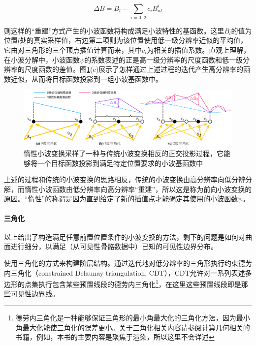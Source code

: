 \begin{equation}
	\Delta B=B_l-\sum_{i=0..2}c_iB^{i}_{nl}
\end{equation}

\noindent 则这样的“重建”方式产生的小波函数将构成满足小波特性的基函数。这里$B_l$的值为位置$l$处的真实采样值，右边第二项则为该位置使用低一级分辨率近似的平均值，它由对三角形的三个顶点插值计算而来，其中$c_i$为相关的插值系数。直观上理解，在小波分解中，小波函数$\psi$的系数表述的正是高一级分辨率的尺度函数和低一级分辨率的尺度函数的差值。图\ref{f:r-triangulation}(c)展示了怎样通过上述过程的迭代产生高分辨率的函数近似，从而将目标函数投影到一组小波基函数中。

\begin{figure}
\begin{fullwidth}
	\includegraphics[width=\thewidth]{figures/r/triangulation}
	\caption{惰性小波变换采样了一种与传统小波变换相反的正交投影过程，它能够将一个目标函数投影到满足特定位置要求的小波基函数中}
	\label{f:r-triangulation}
\end{fullwidth}
\end{figure}

上述的过程和传统的小波变换的思路相反，传统的小波变换由高分辨率向低分辨分解，而惰性小波函数由低分辨率向高分辨率“重建”，所以这是称为前向小波变换的原因。“惰性”的称谓是因为直到给定了新的插值点才能确定其使用的小波函数$\psi$。




\paragraph{三角化}
以上给出了构造满足任意前置位置条件的小波变换的方法，剩下的问题是如何对曲面进行细分，以满足（从可见性骨骼数据中）已知的可见性边界分布。

\cite{a:FastandAccurateHierarchicalRadiosityUsingGlobalVisibility}使用三角化的方式来构建阶层结构。通过迭代地对低分辨率的三角形执行约束德劳内三角化（constrained Delaunay triangulation, CDT）\cite{a:Hierarchicaltriangulationformultiresolutionsurfacedescriptiongeometricdesign}，CDT允许对一系列表述多边形的点集执行包含某些预置线段的德劳内三角化\footnote{德劳内三角化是一种能够保证三角形的最小角最大化的三角化方法，因为最小角最大化能使三角化的误差更小。关于三角化相关内容请参阅计算几何相关的书籍，例如\cite{b:ComputiationalGeometry:AlgorithmsandApplications}，本书的主要内容是聚焦于渲染，所以这里不会详述}，在这里这些预置线段即是那些可见性边界线。

